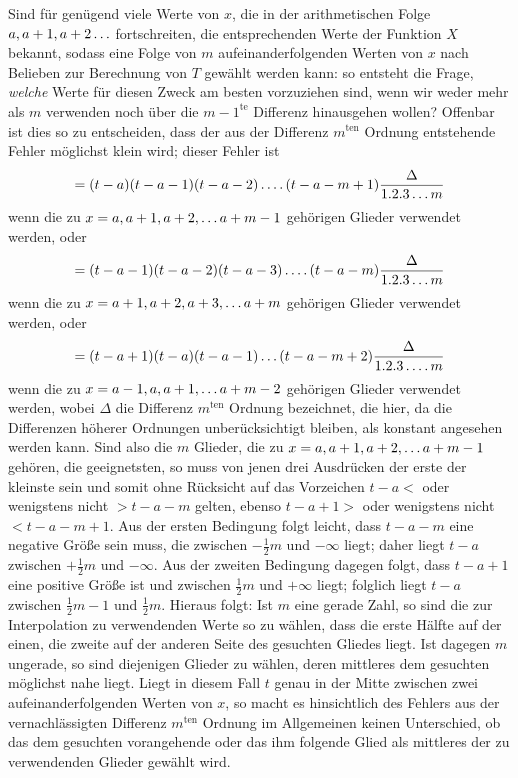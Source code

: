 Sind für genügend viele Werte von \(x\), die in der arithmetischen Folge
\(a,a+1,a+2\mathinner{.\,.\,.}\) fortschreiten, die entsprechenden Werte der Funktion \(X\) bekannt, sodass eine Folge von \(m\)
aufeinanderfolgenden Werten von \(x\) nach Belieben zur Berechnung von \(T\) gewählt werden kann:
so entsteht die Frage, \emph{welche} Werte für diesen Zweck am besten vorzuziehen sind, wenn wir weder mehr als \(m\) verwenden noch über die \(m-1^{\mathrm{te}}\) Differenz hinausgehen wollen?
Offenbar ist dies so zu entscheiden, dass der aus der Differenz \(m^{\mathrm{ten}}\) Ordnung entstehende Fehler
möglichst klein wird; dieser Fehler ist
\[
=(t-a)(t-a-1)(t-a-2)\mathinner{.\,.\,.\,.}(t-a-m+1)\frac{\Delta}{1.2.3\mathinner{.\,.\,.} m}
\]
wenn die zu \(x=a,a+1,a+2,\mathinner{.\,.\,.} a+m-1\) gehörigen Glieder verwendet werden, oder
\[
=(t-a-1)(t-a-2)(t-a-3)\mathinner{.\,.\,.\,.}(t-a-m)\frac{\Delta}{1.2.3\mathinner{.\,.\,.} m}
\]
wenn die zu \(x=a+1,a+2,a+3,\mathinner{.\,.\,.} a+m\) gehörigen Glieder verwendet werden, oder
\[
=(t-a+1)(t-a)(t-a-1)\mathinner{.\,.\,.}(t-a-m+2)\frac{\Delta}{1.2.3\mathinner{.\,.\,.\,.}m}
\]
wenn die zu \(x=a-1,a,a+1,\mathinner{.\,.\,.} a+m-2\) gehörigen Glieder verwendet werden, wobei
\(\Delta\) die Differenz \(m^{\mathrm{ten}}\) Ordnung bezeichnet, die hier, da die Differenzen höherer Ordnungen
unberücksichtigt bleiben, als konstant angesehen werden kann. Sind also die \(m\) Glieder,
die zu \(x=a,a+1,a+2,\mathinner{.\,.\,.} a+m-1\) gehören, die geeignetsten, so muss von jenen
drei Ausdrücken der erste der kleinste sein und somit ohne Rücksicht auf das Vorzeichen \(t-a<\)
oder wenigstens nicht \(>t-a-m\) gelten, ebenso \(t-a+1>\) oder wenigstens nicht \(<t-a-m+1\).
Aus der ersten Bedingung folgt leicht, dass \(t-a-m\) eine negative Größe sein muss, die zwischen \(-\frac12m\) und \(-\infty\) liegt; daher liegt \(t-a\) zwischen \(+\frac12m\) und \(-\infty\). Aus
der zweiten Bedingung dagegen folgt, dass \(t-a+1\) eine positive Größe ist und zwischen \(\frac12m\) und
\(+\infty\) liegt; folglich liegt \(t-a\) zwischen \(\frac12m-1\) und \(\frac12m\). Hieraus folgt: Ist \(m\) eine gerade Zahl, so sind die zur Interpolation zu verwendenden Werte so zu wählen, dass
die erste Hälfte auf der einen, die zweite auf der anderen Seite des gesuchten Gliedes liegt. Ist dagegen
\(m\) ungerade, so sind diejenigen Glieder zu wählen, deren mittleres dem gesuchten möglichst nahe liegt.
Liegt in diesem Fall \(t\) genau in der Mitte zwischen zwei aufeinanderfolgenden Werten von \(x\), so macht es hinsichtlich des Fehlers aus der vernachlässigten Differenz \(m^{\mathrm{ten}}\) Ordnung im Allgemeinen keinen Unterschied, ob das dem gesuchten vorangehende oder das ihm folgende Glied als mittleres
der zu verwendenden Glieder gewählt wird.

